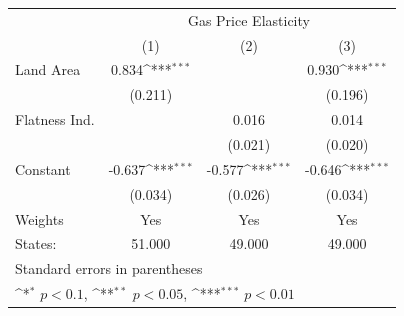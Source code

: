 {
\def\sym#1{\ifmmode^{#1}\else\(^{#1}\)\fi}
\begin{tabular}{l*{3}{c}}
\hline\hline
            &\multicolumn{3}{c}{Gas Price Elasticity}                         \\
            &\multicolumn{1}{c}{(1)}         &\multicolumn{1}{c}{(2)}         &\multicolumn{1}{c}{(3)}         \\
\hline
Land Area   &       0.834\sym{***}&                     &       0.930\sym{***}\\
            &     (0.211)         &                     &     (0.196)         \\
[1em]
Flatness Ind.&                     &       0.016         &       0.014         \\
            &                     &     (0.021)         &     (0.020)         \\
[1em]
Constant    &      -0.637\sym{***}&      -0.577\sym{***}&      -0.646\sym{***}\\
            &     (0.034)         &     (0.026)         &     (0.034)         \\
\hline
Weights     &         Yes         &         Yes         &         Yes         \\
States:     &      51.000         &      49.000         &      49.000         \\
\hline\hline
\multicolumn{4}{l}{\footnotesize Standard errors in parentheses}\\
\multicolumn{4}{l}{\footnotesize \sym{*} \(p<0.1\), \sym{**} \(p<0.05\), \sym{***} \(p<0.01\)}\\
\end{tabular}
}
